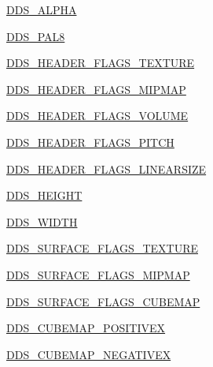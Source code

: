 \begin{DoxyCompactItemize}
\item 
\hyperlink{namespacePIL_1_1DdsImagePlugin_a936d27a7082d84acb53218d2798f0642}{D\+D\+S\+\_\+\+A\+L\+P\+HA}
\item 
\hyperlink{namespacePIL_1_1DdsImagePlugin_a0ca964213a6918137d55aaea6aff8516}{D\+D\+S\+\_\+\+P\+A\+L8}
\item 
\hyperlink{namespacePIL_1_1DdsImagePlugin_a0f66386286e178ca2e870b4f38d9dcf3}{D\+D\+S\+\_\+\+H\+E\+A\+D\+E\+R\+\_\+\+F\+L\+A\+G\+S\+\_\+\+T\+E\+X\+T\+U\+RE}
\item 
\hyperlink{namespacePIL_1_1DdsImagePlugin_aff9627823e22fe8786a074f61fea4273}{D\+D\+S\+\_\+\+H\+E\+A\+D\+E\+R\+\_\+\+F\+L\+A\+G\+S\+\_\+\+M\+I\+P\+M\+AP}
\item 
\hyperlink{namespacePIL_1_1DdsImagePlugin_a80b36362993c905be334346116f0e866}{D\+D\+S\+\_\+\+H\+E\+A\+D\+E\+R\+\_\+\+F\+L\+A\+G\+S\+\_\+\+V\+O\+L\+U\+ME}
\item 
\hyperlink{namespacePIL_1_1DdsImagePlugin_a1749f98da7577c6ae7ef4e5eb363820e}{D\+D\+S\+\_\+\+H\+E\+A\+D\+E\+R\+\_\+\+F\+L\+A\+G\+S\+\_\+\+P\+I\+T\+CH}
\item 
\hyperlink{namespacePIL_1_1DdsImagePlugin_a4f05d4680162cb99f2e7851bb24be6cb}{D\+D\+S\+\_\+\+H\+E\+A\+D\+E\+R\+\_\+\+F\+L\+A\+G\+S\+\_\+\+L\+I\+N\+E\+A\+R\+S\+I\+ZE}
\item 
\hyperlink{namespacePIL_1_1DdsImagePlugin_a961b7a44a0e322c720e1867680d16e92}{D\+D\+S\+\_\+\+H\+E\+I\+G\+HT}
\item 
\hyperlink{namespacePIL_1_1DdsImagePlugin_abbd9ac4cc288d6791dbc1ed5bed0886f}{D\+D\+S\+\_\+\+W\+I\+D\+TH}
\item 
\hyperlink{namespacePIL_1_1DdsImagePlugin_a006a44de18b348431fb38294514d8864}{D\+D\+S\+\_\+\+S\+U\+R\+F\+A\+C\+E\+\_\+\+F\+L\+A\+G\+S\+\_\+\+T\+E\+X\+T\+U\+RE}
\item 
\hyperlink{namespacePIL_1_1DdsImagePlugin_a10bce2edb2a9614c9426ba00ddda1319}{D\+D\+S\+\_\+\+S\+U\+R\+F\+A\+C\+E\+\_\+\+F\+L\+A\+G\+S\+\_\+\+M\+I\+P\+M\+AP}
\item 
\hyperlink{namespacePIL_1_1DdsImagePlugin_adc231f1c4965d5bfce5332f09874a2e1}{D\+D\+S\+\_\+\+S\+U\+R\+F\+A\+C\+E\+\_\+\+F\+L\+A\+G\+S\+\_\+\+C\+U\+B\+E\+M\+AP}
\item 
\hyperlink{namespacePIL_1_1DdsImagePlugin_a87dd53d164af46a367bb280e42598e20}{D\+D\+S\+\_\+\+C\+U\+B\+E\+M\+A\+P\+\_\+\+P\+O\+S\+I\+T\+I\+V\+EX}
\item 
\hyperlink{namespacePIL_1_1DdsImagePlugin_ac13c164da216e83252a867f159080d09}{D\+D\+S\+\_\+\+C\+U\+B\+E\+M\+A\+P\+\_\+\+N\+E\+G\+A\+T\+I\+V\+EX}

\end{DoxyCompactItemize}
